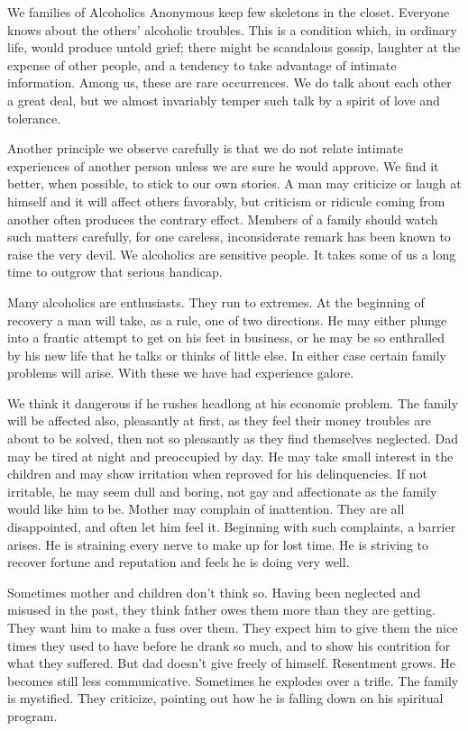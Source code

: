\begin{biblechapter}
We families of Alcoholics Anonymous keep few skeletons in the closet.  Everyone knows about the others' alcoholic troubles.  This is a condition which, in ordinary life, would produce untold grief; there might be scandalous gossip, laughter at the expense of other people, and a tendency to take advantage of intimate information.  Among us, these are rare occurrences.  We do talk about each other a great deal, but we almost invariably temper such talk by a spirit of love and tolerance.

Another principle we observe carefully is that we do not relate intimate experiences of another person unless we are sure he would approve.  We find it better, when possible, to stick to our own stories.  A man may criticize or laugh at himself and it will affect others favorably, but criticism or ridicule coming from another often produces the contrary effect.  Members of a family should watch such matters carefully, for one careless, inconsiderate remark has been known to raise the very devil.  We alcoholics are sensitive people.  It takes some of us a long time to outgrow that serious handicap.

Many alcoholics are enthusiasts.  They run to extremes.  At the beginning of recovery a man will take, as a rule, one of two directions.  He may either plunge into a frantic attempt to get on his feet in business, or he may be so enthralled by his new life that he talks or thinks of little else.  In either case certain family problems will arise.  With these we have had experience galore.

We think it dangerous if he rushes headlong at his economic problem.  The family will be affected also, pleasantly at first, as they feel their money troubles are about to be solved, then not so pleasantly as they find themselves neglected.  Dad may be tired at night and preoccupied by day.  He may take small interest in the children and may show irritation when reproved for his delinquencies.  If not irritable, he may seem dull and boring, not gay and affectionate as the family would like him to be.  Mother may complain of inattention.  They are all disappointed, and often let him feel it.  Beginning with such complaints, a barrier arises.  He is straining every nerve to make up for lost time.  He is striving to recover fortune and reputation and feels he is doing very well.

Sometimes mother and children don't think so.  Having been neglected and misused in the past, they think father owes them more than they are getting.  They want him to make a fuss over them.  They expect him to give them the nice times they used to have before he drank so much, and to show his contrition for what they suffered.  But dad doesn't give freely of himself.  Resentment grows.  He becomes still less communicative.  Sometimes he explodes over a trifle.  The family is mystified.  They criticize, pointing out how he is falling down on his spiritual program.


\end{biblechapter}
